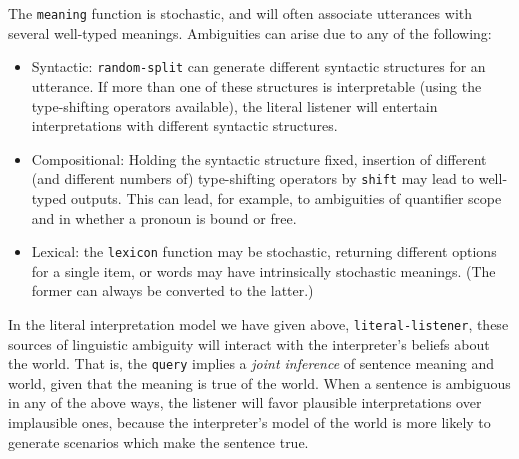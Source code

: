 \documentclass[pdfextras]{handbook}
\begin{document}
The \lstinline{meaning} function is stochastic, and will often associate utterances with several well-typed meanings. 
Ambiguities can arise due to any of the following:
\begin{itemize}
\item Syntactic: \lstinline{random-split} can generate different syntactic structures for an utterance. 
If more than one of these structures is interpretable (using the type-shifting operators available), the literal listener will entertain interpretations with different syntactic structures.
\item Compositional: Holding the syntactic structure fixed, insertion of different (and different numbers of) type-shifting operators by \lstinline{shift} may lead to well-typed outputs. This can lead, for example, to ambiguities of quantifier scope and in whether a pronoun is bound or free.
\item Lexical: the \lstinline{lexicon} function may be stochastic, returning different options for a single item, or words may have intrinsically stochastic meanings. (The former can always be converted to the latter.)
\end{itemize}
In the literal interpretation model we have given above, \lstinline{literal-listener}, these sources of linguistic ambiguity will interact with the interpreter's beliefs about the world.
That is, the \lstinline{query} implies a \emph{joint inference} of sentence meaning and world, given that the meaning is true of the world.
When a sentence is ambiguous in any of the above ways, the listener will favor plausible interpretations over implausible ones, because the interpreter's model of the world is more likely to generate scenarios which make the sentence true. 
\end{document}
